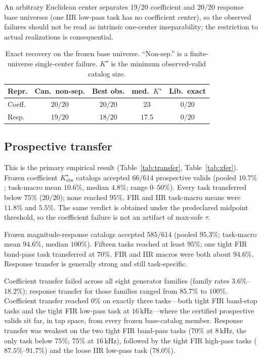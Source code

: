 \documentclass{article}
\begin{document}
An arbitrary Euclidean center separates 19/20 coefficient and
20/20 response base universes (one IIR low-pass task has no
coefficient center), so the observed failures should not be
read as intrinsic one-center inseparability; the restriction
to actual realizations is consequential.

\begin{table}[t]
\caption{Exact recovery on the frozen base universe.
``Non-sep.'' is a finite-universe single-center failure.
$K^\star$ is the minimum observed-valid catalog size.}
\label{tab:base}
\centering
\setlength{\tabcolsep}{4pt}
\begin{tabular}{@{}lcccc@{}}
\toprule
Repr. & Can.\ non-sep. & Best obs. & med.\ $K^\star$ & Lib.\ exact \\
\midrule
Coeff. & $20/20$ & $20/20$ & $23$ & $0/20$ \\
Resp.  & $19/20$ & $18/20$ & $17.5$ & $0/20$ \\
\bottomrule
\end{tabular}
\end{table}

\subsection{Prospective transfer}
This is the primary empirical result (Table~\ref{tab:transfer},
Table~\ref{tab:xfer}).
Frozen coefficient $K^\star_{\mathrm{obs}}$ catalogs accepted
$66/614$ prospective valids (pooled $10.7\%$; task-macro mean
$10.6\%$, median $4.8\%$; range $0$--$50\%$).
Every task transferred below $75\%$ ($20/20$); none reached
$95\%$.
FIR and IIR task-macro means were $11.8\%$ and $5.5\%$.
The same verdict is obtained under the predeclared midpoint
threshold, so the coefficient failure is not an artifact of
max-safe $\tau$.

Frozen magnitude-response catalogs accepted $585/614$ (pooled
$95.3\%$; task-macro mean $94.6\%$, median $100\%$).
Fifteen tasks reached at least $95\%$; one tight FIR band-pass
task transferred at $70\%$.
FIR and IIR macros were both about $94.6\%$.
Response transfer is generally strong and still task-specific.

Coefficient transfer failed across all eight generator families
(family rates $3.6\%$--$18.2\%$); response transfer for those
families ranged from $85.7\%$ to $100\%$.
Coefficient transfer reached $0\%$ on exactly three tasks---both
tight FIR band-stop tasks and the tight FIR low-pass task at
$16\,\mathrm{kHz}$---where the certified prospective valids sit far,
in tap space, from every frozen base-catalog member.
Response transfer was weakest on the two tight FIR band-pass tasks
($70\%$ at $8\,\mathrm{kHz}$, the only task below $75\%$; $75\%$ at
$16\,\mathrm{kHz}$), followed by the tight FIR high-pass tasks
($87.5\%$--$91.7\%$) and the loose IIR low-pass task ($78.0\%$).
\end{document}
